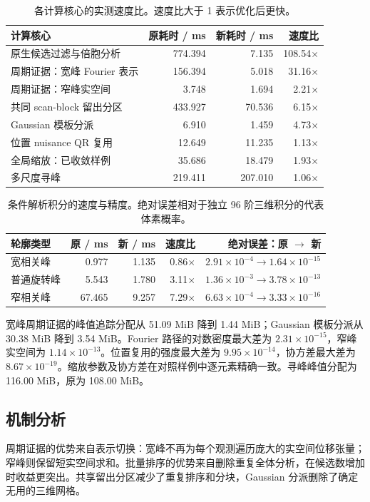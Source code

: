 \documentclass[UTF8,11pt,a4paper,fontset=fandol]{ctexart}
\begin{document}
\begin{table}[htbp]
\centering\small
\caption{各计算核心的实测速度比。速度比大于 1 表示优化后更快。}
\begin{tabular}{@{}lrrr@{}}\toprule
计算核心 & 原耗时 / ms & 新耗时 / ms & 速度比 \\\midrule
原生候选过滤与倍胞分析 & 774.394 & 7.135 & 108.54$\times$ \\
周期证据：宽峰 Fourier 表示 & 156.394 & 5.018 & 31.16$\times$ \\
周期证据：窄峰实空间 & 3.748 & 1.694 & 2.21$\times$ \\
共同 scan-block 留出分区 & 433.927 & 70.536 & 6.15$\times$ \\
Gaussian 模板分派 & 6.910 & 1.459 & 4.73$\times$ \\
位置 nuisance QR 复用 & 12.649 & 11.235 & 1.13$\times$ \\
全局缩放：已收敛样例 & 35.686 & 18.479 & 1.93$\times$ \\
多尺度寻峰 & 219.411 & 207.010 & 1.06$\times$ \\
\bottomrule\end{tabular}
\end{table}
\begin{table}[htbp]
\centering\small
\caption{条件解析积分的速度与精度。绝对误差相对于独立 96 阶三维积分的代表体素概率。}
\begin{tabular}{@{}lrrrr@{}}\toprule
轮廓类型 & 原 / ms & 新 / ms & 速度比 & 绝对误差：原 $\to$ 新 \\\midrule
宽相关峰 & 0.977 & 1.135 & 0.86$\times$ & $2.91\times10^{-4} \to 1.64\times10^{-15}$ \\
普通旋转峰 & 5.543 & 1.780 & 3.11$\times$ & $1.36\times10^{-3} \to 3.78\times10^{-13}$ \\
窄相关峰 & 67.465 & 9.257 & 7.29$\times$ & $6.63\times10^{-4} \to 3.33\times10^{-16}$ \\
\bottomrule\end{tabular}
\end{table}
宽峰周期证据的峰值追踪分配从 51.09 MiB 降到 1.44 MiB；Gaussian 模板分派从 30.38 MiB 降到 3.54 MiB。Fourier 路径的对数密度最大差为 $2.31\times10^{-15}$，窄峰实空间为 $1.14\times10^{-13}$。位置复用的强度最大差为 $9.95\times10^{-14}$，协方差最大差为 $8.67\times10^{-19}$。缩放参数及协方差在对照样例中逐元素精确一致。寻峰峰值分配为 116.00 MiB，原为 108.00 MiB。

\subsection{机制分析}
周期证据的优势来自表示切换：宽峰不再为每个观测遍历庞大的实空间位移张量；窄峰则保留短实空间求和。批量排序的优势来自删除重复全体分析，在候选数增加时收益更突出。共享留出分区减少了重复排序和分块，Gaussian 分派删除了确定无用的三维网格。
\end{document}
